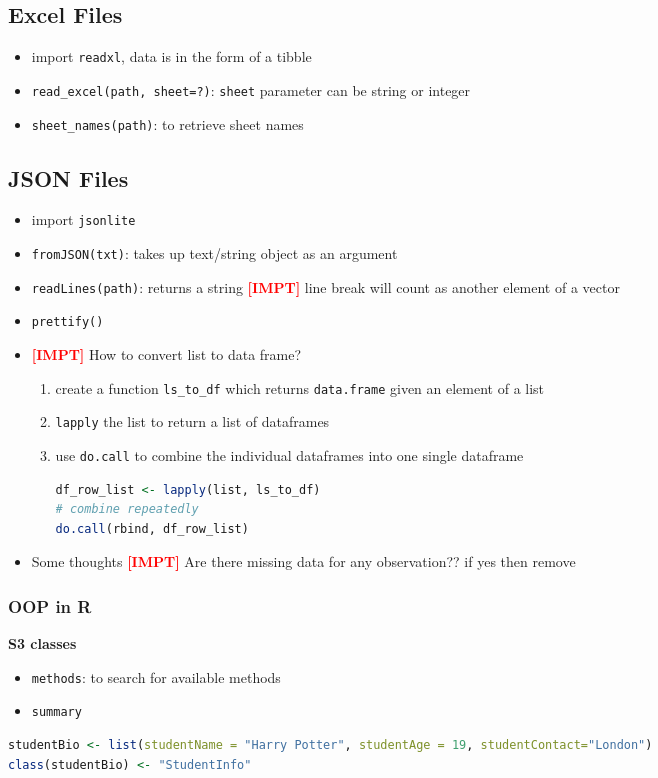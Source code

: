 \documentclass{article}
\newcommand{\impt}[0]{\textcolor{red}{\textbf{[IMPT] }}}
\begin{document}
\begin{multicols}{2}
\subsection*{Excel Files}
\begin{itemize}
	\item import \texttt{readxl}, data is in the form of a tibble
	\item \texttt{read\_excel(path, sheet=?)}: \texttt{sheet} parameter can be string or integer
	\item \texttt{sheet\_names(path)}: to retrieve sheet names
\end{itemize}

\subsection*{JSON Files}
\begin{itemize}
	\item import \texttt{jsonlite}
	\item \texttt{fromJSON(txt)}: takes up text/string object as an argument
	\item \texttt{readLines(path)}: returns a string \impt line break will count as another element of a vector
	\item \texttt{prettify()}
	\item \impt How to convert list to data frame?
	\begin{enumerate}
		\item create a function \texttt{ls\_to\_df} which returns \texttt{data.frame} given an element of a list
		\item \texttt{lapply} the list to return a list of dataframes
		\item use \texttt{do.call} to combine the individual dataframes into one single dataframe
		\begin{lstlisting}[language=R]
df_row_list <- lapply(list, ls_to_df)
# combine repeatedly
do.call(rbind, df_row_list)\end{lstlisting}
	\end{enumerate}
	\item Some thoughts \impt Are there missing data for any observation?? if yes then remove
\end{itemize}
\subsubsection*{OOP in R}
\textbf{S3 classes}
\begin{itemize}
	\item \texttt{methods}: to search for available methods
	\item \texttt{summary}
\end{itemize}
\begin{lstlisting}[language=R]
studentBio <- list(studentName = "Harry Potter", studentAge = 19, studentContact="London")
class(studentBio) <- "StudentInfo"


\end{lstlisting}
\end{multicols}
\end{document}
